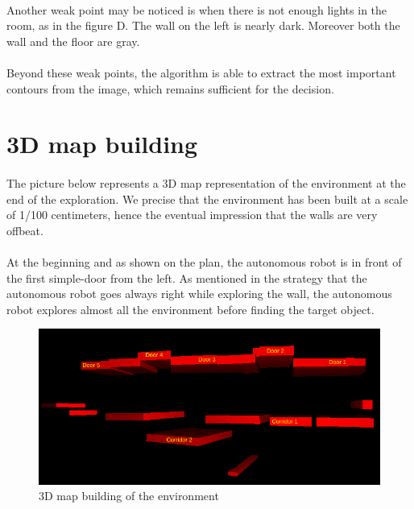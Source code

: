 \documentclass[12pt]{report}
\begin{document}
	\paragraph{}
	Another weak point may be noticed is when there is not enough lights in the room, as in the figure D. The wall on the left is nearly dark. Moreover both  the wall and the floor are gray.
	
	\paragraph{}
	Beyond these weak points, the algorithm is able to extract the most important contours from the image, which remains sufficient for the decision. 
	\section{3D map building}
	\paragraph{}
	The picture below represents a 3D map representation of the environment at the end of the exploration. We precise that the environment has been built at a scale of 1/100 centimeters, hence the eventual impression that the walls are very offbeat.
	\paragraph{}
	At the beginning and as shown on the plan, the autonomous robot is in front of the first simple-door from the left. As mentioned in the strategy that the autonomous robot goes always right while exploring the wall, the autonomous robot explores almost all the environment before finding the target object.
	\begin{figure}[H]
		\begin{center}
			\includegraphics[scale=0.90]{res/3D_recons.png}
			\caption{3D map building of the environment}
		\end{center}
	\end{figure}
	
\end{document}

